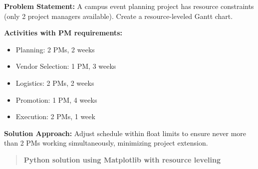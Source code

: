 \documentclass[
  letterpaper,
  DIV=11,
  numbers=noendperiod]{scrreprt}
\providecommand{\tightlist}{%
  \setlength{\itemsep}{0pt}\setlength{\parskip}{0pt}}
\begin{document}
\textbf{Problem Statement:} A campus event planning project has resource
constraints (only 2 project managers available). Create a
resource-leveled Gantt chart.

\textbf{Activities with PM requirements:}

\begin{itemize}
\tightlist
\item
  Planning: 2 PMs, 2 weeks
\item
  Vendor Selection: 1 PM, 3 weeks
\item
  Logistics: 2 PMs, 2 weeks
\item
  Promotion: 1 PM, 4 weeks
\item
  Execution: 2 PMs, 1 week
\end{itemize}

\textbf{Solution Approach:} Adjust schedule within float limits to
ensure never more than 2 PMs working simultaneously, minimizing project
extension.

\begin{quote}
\textbf{Python solution using Matplotlib with resource leveling}
\end{quote}
\end{document}
